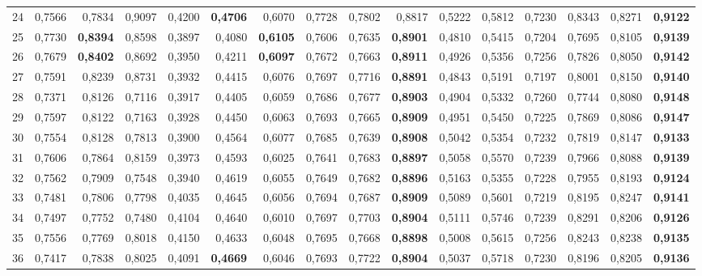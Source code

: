 \begin{table}[htp!]
\begin{adjustwidth}{-2cm}{}
\begin{tabular}{ l | *{15}{| r}}
24	&	0,7566	&	0,7834	&	0,9097	&	0,4200	&	\textbf{0,4706}	&	0,6070	&	0,7728	&	0,7802	&	0,8817	&	0,5222	&	0,5812	&	0,7230	&	0,8343	&	0,8271	&	\textbf{0,9122}	\\
25	&	0,7730	&	\textbf{0,8394}	&	0,8598	&	0,3897	&	0,4080	&	\textbf{0,6105}	&	0,7606	&	0,7635	&	\textbf{0,8901}	&	0,4810	&	0,5415	&	0,7204	&	0,7695	&	0,8105	&	\textbf{0,9139}	\\
26	&	0,7679	&	\textbf{0,8402}	&	0,8692	&	0,3950	&	0,4211	&	\textbf{0,6097}	&	0,7672	&	0,7663	&	\textbf{0,8911}	&	0,4926	&	0,5356	&	0,7256	&	0,7826	&	0,8050	&	\textbf{0,9142}	\\
27	&	0,7591	&	0,8239	&	0,8731	&	0,3932	&	0,4415	&	0,6076	&	0,7697	&	0,7716	&	\textbf{0,8891}	&	0,4843	&	0,5191	&	0,7197	&	0,8001	&	0,8150	&	\textbf{0,9140}	\\
28	&	0,7371	&	0,8126	&	0,7116	&	0,3917	&	0,4405	&	0,6059	&	0,7686	&	0,7677	&	\textbf{0,8903}	&	0,4904	&	0,5332	&	0,7260	&	0,7744	&	0,8080	&	\textbf{0,9148}	\\
29	&	0,7597	&	0,8122	&	0,7163	&	0,3928	&	0,4450	&	0,6063	&	0,7693	&	0,7665	&	\textbf{0,8909}	&	0,4951	&	0,5450	&	0,7225	&	0,7869	&	0,8086	&	\textbf{0,9147}	\\
30	&	0,7554	&	0,8128	&	0,7813	&	0,3900	&	0,4564	&	0,6077	&	0,7685	&	0,7639	&	\textbf{0,8908}	&	0,5042	&	0,5354	&	0,7232	&	0,7819	&	0,8147	&	\textbf{0,9133}	\\
31	&	0,7606	&	0,7864	&	0,8159	&	0,3973	&	0,4593	&	0,6025	&	0,7641	&	0,7683	&	\textbf{0,8897}	&	0,5058	&	0,5570	&	0,7239	&	0,7966	&	0,8088	&	\textbf{0,9139}	\\
32	&	0,7562	&	0,7909	&	0,7548	&	0,3940	&	0,4619	&	0,6055	&	0,7649	&	0,7682	&	\textbf{0,8896}	&	0,5163	&	0,5355	&	0,7228	&	0,7955	&	0,8193	&	\textbf{0,9124}	\\
33	&	0,7481	&	0,7806	&	0,7798	&	0,4035	&	0,4645	&	0,6056	&	0,7694	&	0,7687	&	\textbf{0,8909}	&	0,5089	&	0,5601	&	0,7219	&	0,8195	&	0,8247	&	\textbf{0,9141}	\\
34	&	0,7497	&	0,7752	&	0,7480	&	0,4104	&	0,4640	&	0,6010	&	0,7697	&	0,7703	&	\textbf{0,8904}	&	0,5111	&	0,5746	&	0,7239	&	0,8291	&	0,8206	&	\textbf{0,9126}	\\
35	&	0,7556	&	0,7769	&	0,8018	&	0,4150	&	0,4633	&	0,6048	&	0,7695	&	0,7668	&	\textbf{0,8898}	&	0,5008	&	0,5615	&	0,7256	&	0,8243	&	0,8238	&	\textbf{0,9135}	\\
36	&	0,7417	&	0,7838	&	0,8025	&	0,4091	&	\textbf{0,4669}	&	0,6046	&	0,7693	&	0,7722	&	\textbf{0,8904}	&	0,5037	&	0,5718	&	0,7230	&	0,8196	&	0,8205	&	\textbf{0,9136}	\\

\end{tabular}
\end{adjustwidth}
\end{table}
